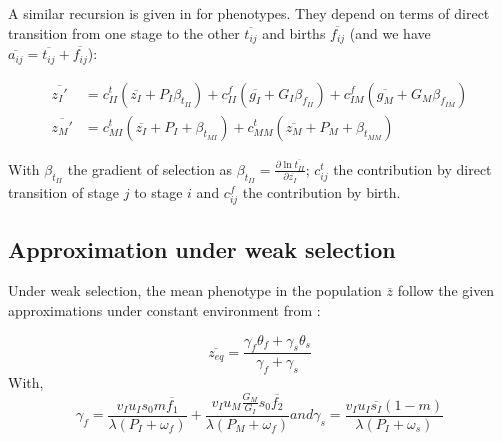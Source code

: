 A similar recursion is given in \citep{barfield_evolution_2011} for phenotypes. They depend on terms of direct transition from one stage to the other $\overline{t_{ij}}$ and births $\overline{f_{ij}}$ (and we have $\overline{a_{ij}} = \overline{t_{ij}} + \overline{f_{ij}}$):

\begin{subequations}
	\begin{align}
	\label{eq:phenotypic}
	\overline{z_I'} &= c_{II}^t (\overline{z_I} + P_I \beta_{t_{II}}) + c_{II}^f (\overline{g_I} + G_I \beta_{f_{II}}) + c_{IM}^f (\overline{g_M} + G_M \beta_{f_{IM}}) \\
	\overline{z_M'} &= c_{MI}^t (\overline{z_I} + P_I + \beta_{t_{MI}}) + c_{MM}^t (\overline{z_M} + P_M + \beta_{t_{MM}})
	\end{align}
\end{subequations}

With $\beta_{t_{II}}$ the gradient of selection as $\beta_{t_{II}} = \frac{\partial \ln \overline{t_{II}}}{\partial \overline{z_I}}$; $c_{ij}^t$ the contribution by direct transition of stage $j$ to stage $i$ and $c_{ij}^f$ the contribution by birth.

\subsection*{Approximation under weak selection}

Under weak selection, the mean phenotype in the population $\overline{z}$ follow the given approximations under constant environment from \citep{engen_evolution_2011}:

\begin{equation}
	\overline{z_{eq}} = \frac{\gamma_{f}\theta_{f} + \gamma_{s}\theta_{s}}{\gamma_{f} + \gamma_{s}}
\end{equation}
With,
\begin{subequations}
	\begin{equation}
	\label{eq:gammaf}
	\gamma_{f} = \frac{v_{I} u_{I} s_{0} m \overline{f_{1}} }{\lambda(P_{I}+\omega_{f})} + \frac{ v_{I} u_{M} \frac{G_{M}}{G_{I}} s_{0} \overline{f_{2}}}{\lambda ( P_{M} + \omega_{f} )}
	\end{equation}
	and
	\begin{equation}
	\label{eq:gammas}
	\gamma_{s} = \frac{ v_{I} u_{I} \overline{s_{I}} (1-m) }{\lambda(P_{I}+\omega_{s})}
	\end{equation}
\end{subequations}


